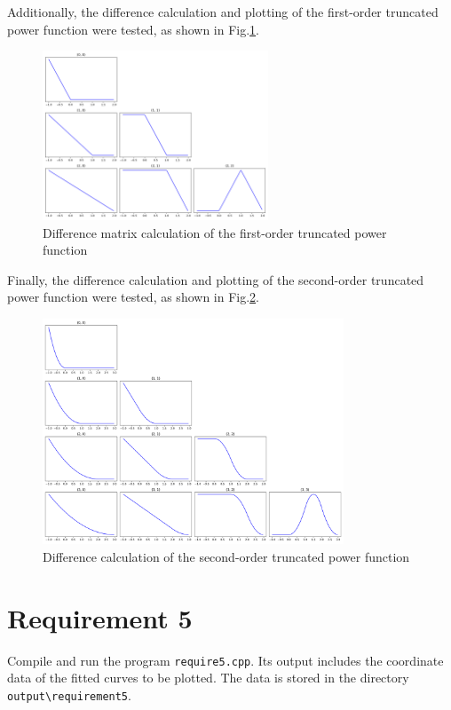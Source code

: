 \documentclass[a4paper]{article}
\begin{document}
\begin{sloppypar}
Additionally, the difference calculation and plotting of the first-order
truncated power function were tested, as shown in
Fig.\ref{fig:divided_trunc_power_1}.
\begin{figure}[H]
  \centering
  \includegraphics[width=0.6\textwidth]{../figure/problemF/divided_1.png}
  \renewcommand{\figurename}{Fig.}
  \caption{Difference matrix calculation of the first-order truncated power function}
  \label{fig:divided_trunc_power_1}
\end{figure}

Finally, the difference calculation and plotting of the second-order truncated
power function were tested, as shown in Fig.\ref{fig:divided_trunc_power_2}.
\begin{figure}[H]
  \centering
  \includegraphics[width=0.8\textwidth]{../figure/problemF/divided_2.png}
  \renewcommand{\figurename}{Fig.}
  \caption{Difference calculation of the second-order truncated power function}
  \label{fig:divided_trunc_power_2}
\end{figure}

\section*{Requirement 5}
Compile and run the program \verb|require5.cpp|. Its output includes the coordinate data of the fitted curves to be plotted. The data is stored in the directory \verb|output\requirement5|.


\end{sloppypar}
\end{document}
